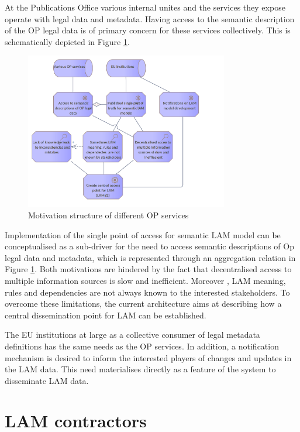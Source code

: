 	At the Publications Office various internal unites and the services they expose operate with legal data and metadata. Having access to the semantic description of the OP legal data is of primary concern for these services collectively. This is schematically depicted in Figure \ref{fig:motivation-op-services}.
	
		
	\begin{figure}[!th]
		\centering
		\includegraphics[width=0.789\textwidth]{images/motivation/EU institutions and OP services motivation.png}
		\caption{Motivation structure of different OP services}
		\label{fig:motivation-op-services}
	\end{figure}

	Implementation of the single point of access for semantic LAM model can be conceptualised as a sub-driver for the need to access semantic descriptions of Op legal data and metadata, which is represented through an aggregation relation in Figure \ref{fig:motivation-op-services}. Both motivations are hindered by the fact that decentralised access to multiple information sources is slow and inefficient. Moreover , LAM meaning, rules and dependencies are not always known to the interested stakeholders. To overcome these limitations, the current architecture aims at describing how a central dissemination point for LAM can be established. 
	
	The EU institutions at large as a collective consumer of legal metadata definitions has the same needs as the OP services. In addition, a notification mechanism is desired to inform the interested players of changes and updates in the LAM data. This need materialises directly as a feature of the system to disseminate LAM data. 
	
	\section{LAM contractors}

